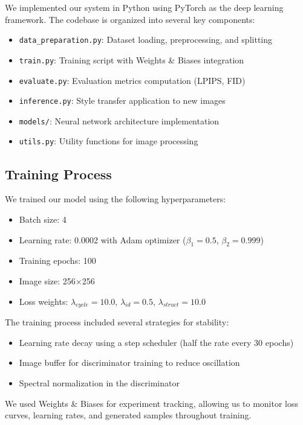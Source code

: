 \documentclass[twocolumn,superscriptaddress,aps]{revtex4-1}
\begin{document}
We implemented our system in Python using PyTorch as the deep learning framework. The codebase is organized into several key components:

\begin{itemize}
    \item \texttt{data\_preparation.py}: Dataset loading, preprocessing, and splitting
    \item \texttt{train.py}: Training script with Weights \& Biases integration
    \item \texttt{evaluate.py}: Evaluation metrics computation (LPIPS, FID)
    \item \texttt{inference.py}: Style transfer application to new images
    \item \texttt{models/}: Neural network architecture implementation
    \item \texttt{utils.py}: Utility functions for image processing
\end{itemize}

\subsection{Training Process}

We trained our model using the following hyperparameters:

\begin{itemize}
    \item Batch size: 4
    \item Learning rate: 0.0002 with Adam optimizer ($\beta_1=0.5$, $\beta_2=0.999$)
    \item Training epochs: 100
    \item Image size: 256×256
    \item Loss weights: $\lambda_{cycle}=10.0$, $\lambda_{id}=0.5$, $\lambda_{struct}=10.0$
\end{itemize}

The training process included several strategies for stability:
\begin{itemize}
    \item Learning rate decay using a step scheduler (half the rate every 30 epochs)
    \item Image buffer for discriminator training to reduce oscillation
    \item Spectral normalization in the discriminator
\end{itemize}

We used Weights \& Biases for experiment tracking, allowing us to monitor loss curves, learning rates, and generated samples throughout training.
\end{document}
